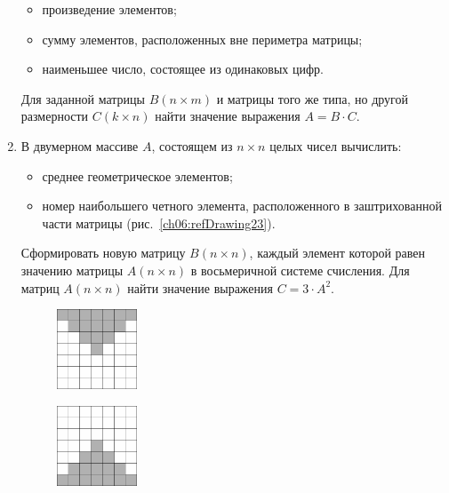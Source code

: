 \begin{enumerate}
\begin{itemize}
\item произведение элементов;
\item сумму элементов, расположенных вне периметра матрицы;
\item наименьшее число, состоящее из одинаковых цифр.
\end{itemize}

Для заданной матрицы $B(n\times m)$ и матрицы того же типа, но другой размерности
$C(k\times n)$ найти значение выражения  $A=B\cdot C$.
\item В двумерном массиве $A$, состоящем из $n\times n$ целых чисел вычислить:

\begin{itemize}
\item среднее геометрическое элементов;
\item номер наибольшего четного элемента, расположенного в заштрихованной части матрицы (рис.~\ref{ch06:refDrawing23}).
\end{itemize}

Сформировать новую матрицу $B(n\times n)$, каждый элемент которой равен значению матрицы
$A(n\times n)$ в восьмеричной системе счисления. Для матриц $A(n\times n)$ найти
значение выражения  $C=3\cdot A^2$.

\begin{figure}%
\begin{floatrow}[4]
\ffigbox[\FBwidth]
{%
\captionsetup{labelfont=footnotesize}\caption{}%
\label{ch06:refDrawing23}}
{\includegraphics[width=0.225\textwidth,keepaspectratio]{img/ris_6_24}}%

\ffigbox[\FBwidth]
{\caption{}%
\label{ch06:refDrawing24}}
{\includegraphics[width=0.225\textwidth,keepaspectratio]{img/ris_6_25}}%


\end{floatrow}
\end{figure}
\end{enumerate}
